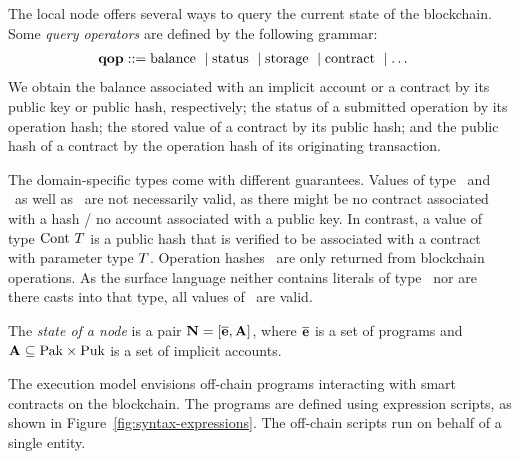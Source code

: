 \documentclass[runningheads]{llncs}
\begin{document}
The local node offers several ways to query the current state of
the blockchain.
Some \emph{query operators} are defined by the following grammar:
\begin{align*}
  \QOP & ::=
         \GETBALANCE{}%
  \mid \GETSTATUS{}%
  \mid \GETSTORAGE{}%
         \mid \GETCONTRACT{}%
         \mid \dots
\end{align*}
We obtain the balance associated with an implicit account or a
contract by its public key or public hash, respectively; the status of
a submitted operation by its operation hash; the stored value of a
contract by its public hash; and the public hash of a contract by the
operation hash of its originating transaction.

The domain-specific types come with different guarantees. Values of
type \TPUH\ and \TPUK\ as well as \TADDR\ are not necessarily valid,
as there might be no contract associated with a hash / no account
associated with a public key. In contrast, a value of type
$\text{Cont}\ T$ is a public hash that is verified to be associated
with a contract with parameter type $T$. Operation hashes \OPH\
are only returned from blockchain operations. As the surface language
neither contains literals of type \TOPH\ nor are there casts into
that type, all values of \TOPH\ are valid. 

\begin{definition}%
  The \emph{state of a node} is a pair
  $\textbf{N} = [ \overline{\textbf{e}}, \textbf{A}
  ]$, where $\overline{\textbf{e}}$ is a
  set of programs and $\textbf{A} \subseteq \text{Pak} \times \text{Puk}$  is a set of
  implicit accounts.
\end{definition}

The execution model envisions off-chain programs interacting with smart contracts on the blockchain. The programs are defined using expression scripts, as shown in Figure~\ref{fig:syntax-expressions}. The off-chain scripts run on behalf of a single entity. 
\end{document}
